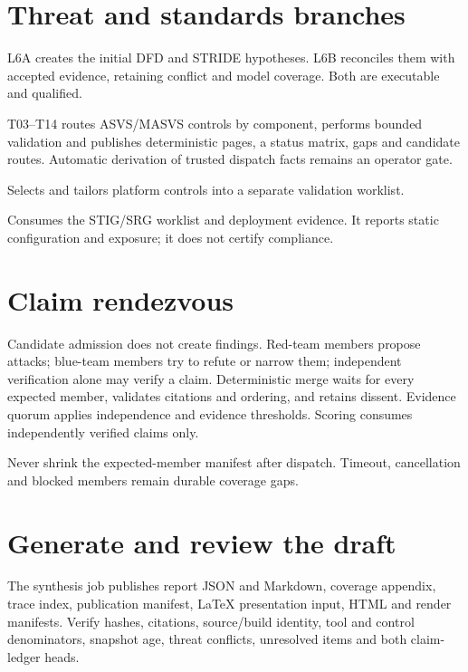 \documentclass[10pt,a4paper]{article}
\begin{document}
\section{Threat and standards branches}
\begin{description}[style=nextline,font=\sffamily\bfseries]
\item[L6A and L6B threat model] L6A creates the initial DFD and STRIDE hypotheses. L6B reconciles
them with accepted evidence, retaining conflict and model coverage. Both are executable and qualified.
\item[OWASP] T03--T14 routes ASVS/MASVS controls by component, performs bounded validation and
publishes deterministic pages, a status matrix, gaps and candidate routes. Automatic derivation of
trusted dispatch facts remains an operator gate.
\item[STIG/SRG] Selects and tailors platform controls into a separate validation worklist.
\item[Deployment hardening] Consumes the STIG/SRG worklist and deployment evidence. It reports
static configuration and exposure; it does not certify compliance.
\end{description}

\section{Claim rendezvous}
Candidate admission does not create findings. Red-team members propose attacks; blue-team members
try to refute or narrow them; independent verification alone may verify a claim. Deterministic merge
waits for every expected member, validates citations and ordering, and retains dissent. Evidence
quorum applies independence and evidence thresholds. Scoring consumes independently verified claims
only.

Never shrink the expected-member manifest after dispatch. Timeout, cancellation and blocked members
remain durable coverage gaps.

\section{Generate and review the draft}
\begin{terminal}
\end{terminal}

The synthesis job publishes report JSON and Markdown, coverage appendix, trace index, publication
manifest, LaTeX presentation input, HTML and render manifests. Verify hashes,
citations, source/build identity, tool and control denominators, snapshot age, threat conflicts,
unresolved items and both claim-ledger heads.
\end{document}

